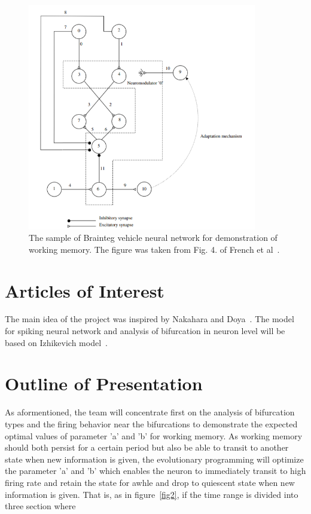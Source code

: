 \documentclass[paper=a4, fontsize=11pt]{article} %
\numberwithin{equation}{section} %
\numberwithin{table}{section} %
\begin{document}
\begin{figure}[H]
\centering
  \includegraphics[width = 100mm, scale = 0.8]{./fig/Braienteg_vehicle.png}
  \caption{The sample of Brainteg vehicle neural network for demonstration of working memory. The figure was taken from Fig. 4. of French et al~\cite{french2005introducing}.}
  \label{fig1}
\end{figure}

\section*{Articles of Interest} 

The main idea of the project was inspired by Nakahara and Doya~\cite{nakahara1998near}. The model for spiking neural network and analysis of bifurcation in neuron level will be based on Izhikevich model~\cite{izhikevich2003simple, moehlis2008dynamical}.

\section*{Outline of Presentation}

As aformentioned, the team will concentrate first on the analysis of bifurcation types and the firing behavior near the bifurcations to demonstrate the expected optimal values of parameter 'a' and 'b' for working memory. As working memory should both persist for a certain period but also be able to transit to another state when new information is given, the evolutionary programming will optimize the parameter 'a' and 'b' which enables the neuron to immediately transit to high firing rate and retain the state for awhle and drop to quiescent state when new information is given. That is, as in figure~\ref{fig2}, if the time range is divided into three section where 
\end{document}
